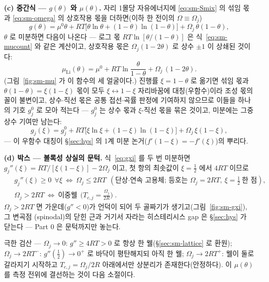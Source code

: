 \textbf{(c) 중간식 --- $g(\theta)$ 와 $\mu(\theta)$.} 자리 1몰당 자유에너지에 \eqref{eq:sm-Smix} 의 섞임 몫과
\eqref{eq:sm-omega} 의 상호작용 몫을 더하면(이하 한 전이의 $\Omega\equiv\Omega_j$)
\begin{equation}
g(\theta)=\mu^0\theta+RT\big[\theta\ln\theta+(1-\theta)\ln(1-\theta)\big]+\Omega_j\,\theta(1-\theta),
\label{eq:sm-gtheta}
\end{equation}
$\theta$ 로 미분하면 다음이 나온다 --- 로그 몫 $RT\ln[\theta/(1-\theta)]$ 은 식~\eqref{eq:sm-mucount} 와 같은 계산이고,
상호작용 몫은 $\Omega_j(1-2\theta)$ 로 상수 $\pm1$ 이 상쇄된 것이다:
\begin{equation}
\mu_\mathrm{Li}(\theta)=\mu^0+RT\ln\frac{\theta}{1-\theta}+\Omega_j\,(1-2\theta).
\label{eq:mu}
\end{equation}
(그림~\ref{fig:sm-mu} 가 이 함수의 세 얼굴이다.) 진행률 $\xi=1-\theta$ 로 옮기면 섞임 몫과
$\theta(1-\theta)=\xi(1-\xi)$ 몫이 모두 $\xi\leftrightarrow1-\xi$ 자리바꿈에 대칭(우함수)이라 조성 몫의 꼴이
불변이고, 상수$\cdot$직선 몫은 공통 접선$\cdot$곡률 판정에 기여하지 않으므로 이들을 하나의 기호 $g_j^0$ 로 모아 적는다 ---
$g_j^0$ 는 상수 몫과 $\xi$-직선 몫을 묶은 것이고, 미분에는 그중 상수 기여만 남는다:
\begin{equation}
g_j(\xi)=g_j^0+RT\big[\xi\ln\xi+(1-\xi)\ln(1-\xi)\big]+\Omega_j\,\xi(1-\xi),
\label{eq:gxi}
\end{equation}
--- 이 우함수 대칭이 \S\ref{sec:hys} 의 1계 미분 논거($f'(1-\xi)=-f'(\xi)$)의 뿌리다.

\textbf{(d) 박스 --- 볼록성 상실의 문턱.} 식~\eqref{eq:gxi} 를 두 번 미분하면
$g_j''(\xi)=RT/[\xi(1-\xi)]-2\Omega_j$ 이고, 첫 항의 최솟값이 $\xi=\tfrac12$ 에서 $4RT$ 이므로
\begin{equation}
\boxed{\;
\begin{aligned}
&g_j''(\xi)\ge0\ \ \forall\xi\ \Longleftrightarrow\ \Omega_j\le2RT\ \ (\text{단상·연속 고용체; 등호는 }\Omega_j{=}2RT,\ \xi{=}\tfrac12\ \text{한 점}),\\
&\Omega_j>2RT\ \Longleftrightarrow\ \text{이중웰}\ \ \Big(T_{c,j}=\frac{\Omega_j}{2R}\Big)\;.
\end{aligned}}
\label{eq:sm-thresh}
\end{equation}
$\Omega_j>2RT$ 면 가운데($g''<0$)가 언덕이 되어 두 골짜기가 생기고(그림~\ref{fig:sm-gxi}), 그 변곡점
(spinodal)의 닫힌 근과 거기서 자라는 히스테리시스 gap 은 \S\ref{sec:hys} 가 닫는다 --- Part 0 은 문턱까지만
놓는다.
\begin{verifybox}
극한 검산 --- $\Omega_j\to0$: $g''\ge4RT>0$ 로 항상 한 웰(\S\ref{sec:sm-lattice} 로 환원);
$\Omega_j\to2RT^-$: $g''(\tfrac12)\to0^+$ 로 바닥이 평탄해지되 아직 한 웰; $\Omega_j\to2RT^+$: 웰이 둘로
갈라지기 시작하고 $T_{c,j}=\Omega_j/2R$ 아래에서만 상분리가 존재한다(안정하다). 이 $\mu(\theta)$ 를 측정 전위에 결선하는
것이 다음 소절이다.
\end{verifybox}

